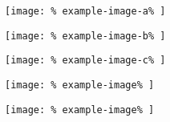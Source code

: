 \documentclass{article}
\newlength{%
		\vamaxheight%
	}%
\begin{document}
%

\noindent
\begin{minipage}[b][\ht\vabox][b]{%
		.10\textwidth%
	}
	\centering
	\texttt{[image: \%
		example-image-a\%
	]}%
\end{minipage}
%
\hfill
\begin{minipage}[b][\ht\vabox][t]{%
		.15\textwidth%
	}
	\centering
	\texttt{[image: \%
		example-image-b\%
	]}%
\end{minipage}
%
\hfill
\begin{minipage}[b][\ht\vabox][t]{%
		.20\textwidth%
	}
	\centering
	\texttt{[image: \%
		example-image-c\%
	]}%
\end{minipage}
%
\hfill
\begin{minipage}[b][\ht\vabox][c]{%
		.10\textwidth%
	}
	\centering
	\texttt{[image: \%
		example-image\%
	]}%
\end{minipage}
%
\hfill
\begin{minipage}[b][\ht\vabox][t]{%
		.20\textwidth%
	}
	\centering
	\texttt{[image: \%
		example-image\%
	]}%
\end{minipage}
%
\par\lipsum
\end{document}
